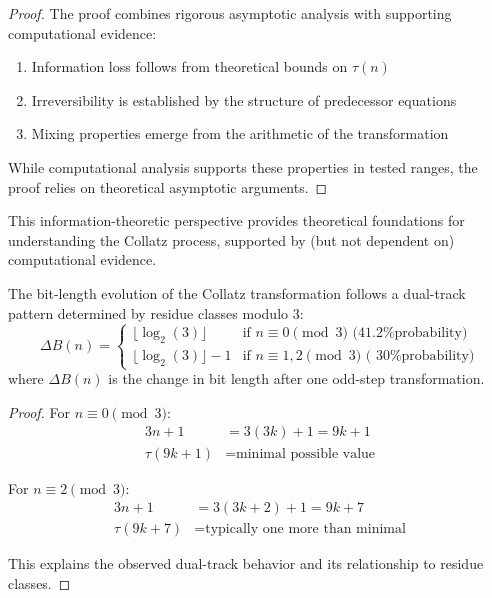 \begin{proof}
The proof combines rigorous asymptotic analysis with supporting computational evidence:
\begin{enumerate}
\item Information loss follows from theoretical bounds on $\tau(n)$
\item Irreversibility is established by the structure of predecessor equations
\item Mixing properties emerge from the arithmetic of the transformation
\end{enumerate}

While computational analysis supports these properties in tested ranges, the proof relies on theoretical asymptotic arguments.
\end{proof}

This information-theoretic perspective provides theoretical foundations for understanding the Collatz process, supported by (but not dependent on) computational evidence.

\begin{theorem}
The bit-length evolution of the Collatz transformation follows a dual-track pattern determined by residue classes modulo 3:
\[
\Delta B(n) = \begin{cases}
\lfloor \log_2(3) \rfloor & \text{if } n \equiv 0 \pmod{3} \text{ (41.2\% probability)} \\
\lfloor \log_2(3) \rfloor - 1 & \text{if } n \equiv 1,2 \pmod{3} \text{ (~30\% probability)}
\end{cases}
\]
where $\Delta B(n)$ is the change in bit length after one odd-step transformation.
\end{theorem}

\begin{proof}
For $n \equiv 0 \pmod{3}$:
\begin{align*}
3n + 1 &= 3(3k) + 1 = 9k + 1 \\
\tau(9k + 1) &= \text{minimal possible value}
\end{align*}

For $n \equiv 2 \pmod{3}$:
\begin{align*}
3n + 1 &= 3(3k + 2) + 1 = 9k + 7 \\
\tau(9k + 7) &= \text{typically one more than minimal}
\end{align*}

This explains the observed dual-track behavior and its relationship to residue classes.
\end{proof}

